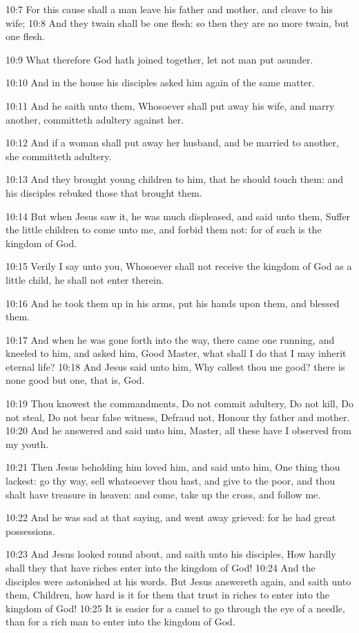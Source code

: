 10:7 For this cause shall a man leave his father and mother, and cleave to his wife; 10:8 And they twain shall be one flesh: so then they are no more twain, but one flesh.

10:9 What therefore God hath joined together, let not man put asunder.

10:10 And in the house his disciples asked him again of the same matter.

10:11 And he saith unto them, Whosoever shall put away his wife, and marry another, committeth adultery against her.

10:12 And if a woman shall put away her husband, and be married to another, she committeth adultery.

10:13 And they brought young children to him, that he should touch them: and his disciples rebuked those that brought them.

10:14 But when Jesus saw it, he was much displeased, and said unto them, Suffer the little children to come unto me, and forbid them not: for of such is the kingdom of God.

10:15 Verily I say unto you, Whosoever shall not receive the kingdom of God as a little child, he shall not enter therein.

10:16 And he took them up in his arms, put his hands upon them, and blessed them.

10:17 And when he was gone forth into the way, there came one running, and kneeled to him, and asked him, Good Master, what shall I do that I may inherit eternal life?  10:18 And Jesus said unto him, Why callest thou me good? there is none good but one, that is, God.

10:19 Thou knowest the commandments, Do not commit adultery, Do not kill, Do not steal, Do not bear false witness, Defraud not, Honour thy father and mother.  10:20 And he answered and said unto him, Master, all these have I observed from my youth.

10:21 Then Jesus beholding him loved him, and said unto him, One thing thou lackest: go thy way, sell whatsoever thou hast, and give to the poor, and thou shalt have treasure in heaven: and come, take up the cross, and follow me.

10:22 And he was sad at that saying, and went away grieved: for he had great possessions.

10:23 And Jesus looked round about, and saith unto his disciples, How hardly shall they that have riches enter into the kingdom of God!  10:24 And the disciples were astonished at his words. But Jesus answereth again, and saith unto them, Children, how hard is it for them that trust in riches to enter into the kingdom of God!  10:25 It is easier for a camel to go through the eye of a needle, than for a rich man to enter into the kingdom of God.

